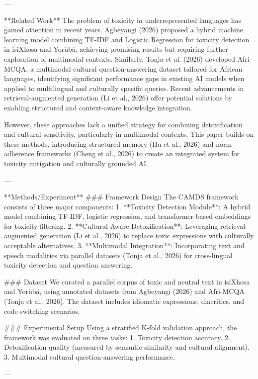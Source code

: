---

**Related Work**  
The problem of toxicity in underrepresented languages has gained attention in recent years. Agbeyangi (2026) proposed a hybrid machine learning model combining TF-IDF and Logistic Regression for toxicity detection in isiXhosa and Yorùbá, achieving promising results but requiring further exploration of multimodal contexts. Similarly, Tonja et al. (2026) developed Afri-MCQA, a multimodal cultural question-answering dataset tailored for African languages, identifying significant performance gaps in existing AI models when applied to multilingual and culturally specific queries. Recent advancements in retrieval-augmented generation (Li et al., 2026) offer potential solutions by enabling structured and context-aware knowledge integration.

However, these approaches lack a unified strategy for combining detoxification and cultural sensitivity, particularly in multimodal contexts. This paper builds on these methods, introducing structured memory (Hu et al., 2026) and norm-adherence frameworks (Cheng et al., 2026) to create an integrated system for toxicity mitigation and culturally grounded AI.

---

**Methods/Experiment**  
### Framework Design  
The CAMDS framework consists of three major components:  
1. **Toxicity Detection Module**: A hybrid model combining TF-IDF, logistic regression, and transformer-based embeddings for toxicity filtering.  
2. **Cultural-Aware Detoxification**: Leveraging retrieval-augmented generation (Li et al., 2026) to replace toxic expressions with culturally acceptable alternatives.  
3. **Multimodal Integration**: Incorporating text and speech modalities via parallel datasets (Tonja et al., 2026) for cross-lingual toxicity detection and question answering.

### Dataset  
We curated a parallel corpus of toxic and neutral text in isiXhosa and Yorùbá, using annotated datasets from Agbeyangi (2026) and Afri-MCQA (Tonja et al., 2026). The dataset includes idiomatic expressions, diacritics, and code-switching scenarios.

### Experimental Setup  
Using a stratified K-fold validation approach, the framework was evaluated on three tasks:  
1. Toxicity detection accuracy.  
2. Detoxification quality (measured by semantic similarity and cultural alignment).  
3. Multimodal cultural question-answering performance.

---

